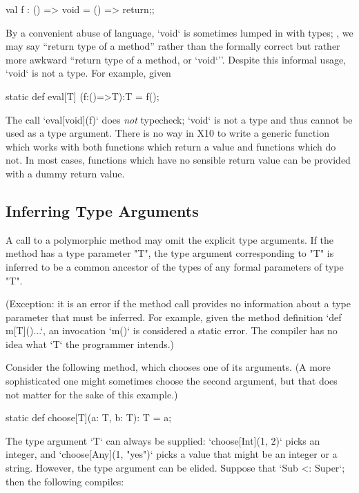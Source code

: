{%
\begin{xten}
val f : () => void = () => {return;};
\end{xten}

By a convenient abuse of language, \xcd`void` is sometimes
lumped in with types; \eg, we may say ``return type of a method'' rather than
the formally correct but rather more awkward ``return type of a method, or
\xcd`void`''.   Despite this informal usage, \xcd`void` is not a type.  For
example, given 
\begin{xten}
  static def eval[T] (f:()=>T):T = f();
\end{xten}
\noindent
The call \xcd`eval[void](f)` does {\em not} typecheck; \xcd`void` is not a
type and thus cannot be used as a type argument.  There is no way in X10 to
write a generic function which works with both functions which return a value
and functions which do not.  In most cases, functions which have no sensible
return value can be provided with a dummy return value.

\subsection{Inferring Type Arguments}
\label{TypeParamInfer}


A call to a polymorphic method %
may omit the
explicit type arguments.  If the method has a type parameter
\xcd"T", the type argument corresponding to \xcd"T" is inferred
to be a common ancestor of the types of any formal
parameters of type \xcd"T".

(Exception: it is an error if the method call provides no information about
a type parameter that must be inferred.  For example, given the method
definition \xcd`def m[T](){...}`, an invocation \xcd`m()` is considered a
static error.  The compiler has no idea what \xcd`T` the programmer intends.)


Consider the following method, which chooses one of its arguments.  (A more
sophisticated one might sometimes choose the second argument, but that does
not matter for the sake of this example.)
\begin{xten}
static def choose[T](a: T, b: T): T = a; 
\end{xten}

The type argument \xcd`T` can always be supplied: 
\xcd`choose[Int](1, 2)` picks an integer, 
and \xcd`choose[Any](1, "yes")` picks a value that might be an integer or a
string.  
However, the type argument can be elided.  Suppose that \xcd`Sub <: Super`;
then the following compiles: 

}
